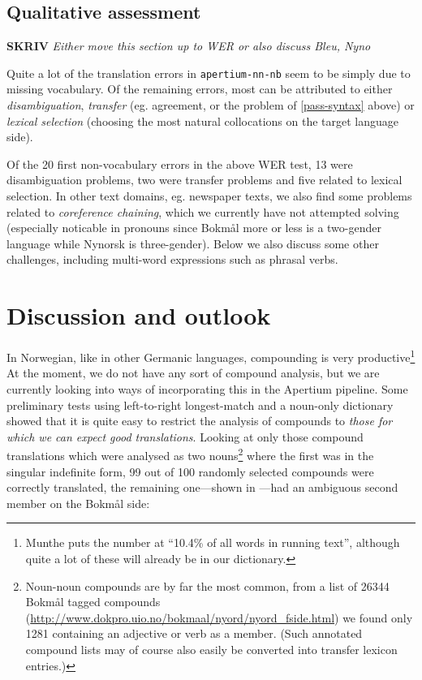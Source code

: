 \documentclass[11pt]{article}
\newcommand{\comment}[1]{\textbf{SKRIV} {\it #1}}
\begin{document}
\subsection{Qualitative assessment}
\comment{Either move this section up to WER or also discuss Bleu, Nyno}

Quite a lot of the translation errors in {\tt apertium-nn-nb} seem to be
simply due to missing vocabulary. Of the remaining errors, most can be
attributed to either \emph{disambiguation}, \emph{transfer} (eg.
agreement, or the problem of \ref{pass-syntax} above) or \emph{lexical
  selection} (choosing the most natural collocations on the target
language side).

Of the 20 first non-vocabulary errors in the above WER test, 13 were
disambiguation problems, two were transfer problems and five related
to lexical selection. In other text domains, eg. newspaper texts, we
also find some problems related to \emph{coreference chaining}, which
we currently have not attempted solving (especially noticable in
pronouns since Bokmål more or less is a two-gender language while
Nynorsk is three-gender). Below we also discuss some other challenges,
including multi-word expressions such as phrasal verbs.

\section{Discussion and outlook}
In Norwegian, like in other Germanic languages, compounding is very
productive\footnote{Munthe \citep[1972, in][p.~1]{johannessen1996aan}
  puts the number at ``10.4\% of all words in running text'', although
  quite a lot of these will already be in our dictionary.} At the
moment, we do not have any sort of compound analysis, but we are
currently looking into ways of incorporating this in the Apertium
pipeline. Some preliminary tests using left-to-right longest-match and
a noun-only dictionary showed that it is quite easy to restrict the
analysis of compounds to \emph{those for which we can expect good
  translations}. Looking at only those compound translations which
were analysed as two nouns\footnote{Noun-noun compounds are
  by far the most common, from a list of 26344 Bokmål tagged compounds
  (\href{http://www.dokpro.uio.no/bokmaal/nyord/nyord_fside.html}{http://www.dokpro.uio.no/bokmaal/nyord/nyord\_fside.html})
  we
  found only 1281 containing an adjective or verb as a member. (Such
  annotated compound lists may of course also easily be converted into
  transfer lexicon entries.)} where the first was in the singular
indefinite form, 99 out of 100 randomly selected compounds were
correctly translated, the remaining one—shown in \Next[b]—had an
ambiguous second member on the Bokmål side:
\end{document}
